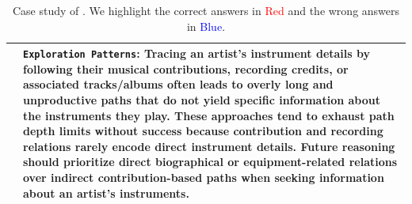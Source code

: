 \begin{table}[h]
\begin{tabular}{>{\centering\arraybackslash}m{2.5cm}|p{12.2cm}}
 \\
& \texttt{\textbf{Exploration Patterns}}: Tracing an artist’s instrument details by following their musical contributions, recording credits, or associated tracks/albums often leads to overly long and unproductive paths that do not yield specific information about the instruments they play. These approaches tend to exhaust path depth limits without success because contribution and recording relations rarely encode direct instrument details. Future reasoning should prioritize direct biographical or equipment-related relations over indirect contribution-based paths when seeking information about an artist’s instruments. \\
\bottomrule
\end{tabular}
\caption{Case study of \method{}. We highlight the correct answers in \textcolor{red}{Red} and the wrong answers in \textcolor{blue}{Blue}.}
\label{tab:case_study2}
\end{table}

\newpage

